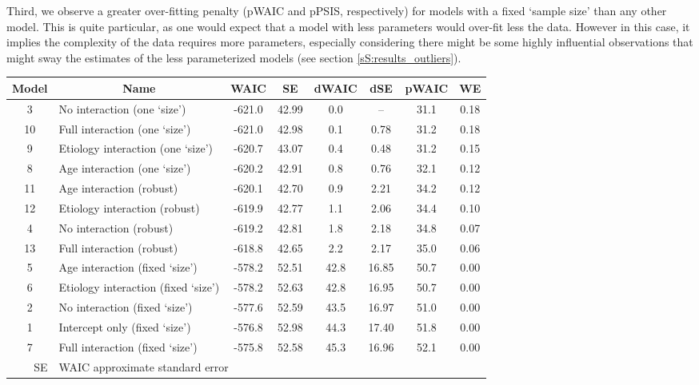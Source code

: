 Third, we observe a greater over-fitting penalty (pWAIC and pPSIS, respectively) for models with a fixed `sample size' than any other model. This is quite particular, as one would expect that a model with less parameters would over-fit less the data. However in this case, it implies the complexity of the data requires more parameters, especially considering there might be some highly influential observations that might sway the estimates of the less parameterized models (see section \ref{sS:results_outliers}). 
%
\begin{table}[h!]
	\centering
	\begin{tabular}{|c|lcccccc|} 
		\hline
		Model & \multicolumn{1}{c}{Name} & WAIC & SE & dWAIC & dSE & pWAIC & WE \\[0.5ex] 
		\hline\hline
		\rowcolor{gray}
		3 & No interaction (one `size') & -621.0 & 42.99 & 0.0 & -- & 31.1 & 0.18 \\
		10 & Full interaction (one `size') & -621.0 & 42.98 & 0.1 & 0.78 & 31.2 & 0.18 \\
		\rowcolor{gray}
		9 & Etiology interaction (one `size') & -620.7 & 43.07 & 0.4 & 0.48 & 31.2 & 0.15 \\
		8 & Age interaction (one `size') & -620.2 & 42.91 & 0.8 & 0.76 & 32.1 & 0.12 \\
		\rowcolor{gray}
		11 & Age interaction (robust) & -620.1 & 42.70 & 0.9 & 2.21 & 34.2 & 0.12 \\
		12 & Etiology interaction (robust) & -619.9 & 42.77 & 1.1 & 2.06 & 34.4 & 0.10 \\
		\rowcolor{gray}
		4 & No interaction (robust) & -619.2 & 42.81 & 1.8 & 2.18 & 34.8 & 0.07 \\
		13 & Full interaction (robust) & -618.8 & 42.65 & 2.2 & 2.17 & 35.0 & 0.06 \\
		\rowcolor{gray}
		5 & Age interaction (fixed `size') & -578.2 & 52.51 & 42.8 & 16.85 & 50.7 & 0.00 \\
		6 & Etiology interaction (fixed `size') & -578.2 & 52.63 & 42.8 & 16.95 & 50.7 & 0.00 \\
		\rowcolor{gray}
		2 & No interaction (fixed `size') & -577.6 & 52.59 & 43.5 & 16.97 & 51.0 & 0.00 \\
		1 & Intercept only (fixed `size') & -576.8 & 52.98 & 44.3 & 17.40 & 51.8 & 0.00 \\
		\rowcolor{gray}
		7 & Full interaction (fixed `size') & -575.8 & 52.58 & 45.3 & 16.96 & 52.1 & 0.00 \\
		\hline\hline
		\multicolumn{1}{|r|}{\small SE} & \multicolumn{7}{l|}{\small WAIC approximate standard error} \\

\end{tabular}
\end{table}
